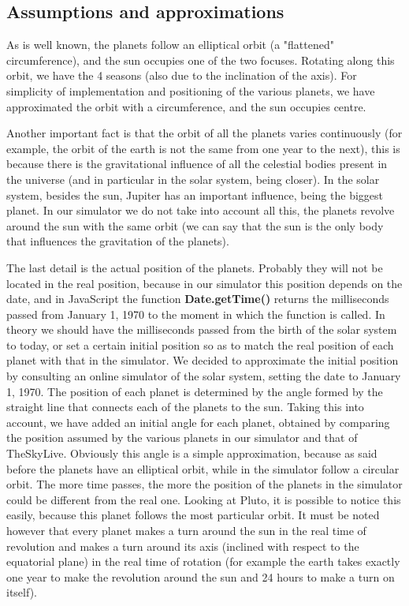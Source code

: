 \documentclass{article}
\begin{document}
\subsection{Assumptions and approximations}
As is well known, the planets follow an elliptical orbit (a "flattened" circumference), and the sun occupies one of the two focuses. Rotating along this orbit, we have the 4 seasons (also due to the inclination of the axis). For simplicity of implementation and positioning of the various planets, we have approximated the orbit with a circumference, and the sun occupies  centre. \newline
\par Another important fact is that the orbit of all the planets varies continuously (for example, the orbit of the earth is not the same from one year to the next), this is because there is the gravitational influence of all the celestial bodies present in the universe (and in particular in the solar system, being closer). In the solar system, besides the sun, Jupiter has an important influence, being the biggest planet. In our simulator we do not take into account all this, the planets revolve around the sun with the same orbit (we can say that the sun is the only body that influences the gravitation of the planets). \newline
\par The last detail is the actual position of the planets. Probably they will not be located in the real position, because in our simulator this position depends on the date, and in JavaScript the function \textbf{Date.getTime()} returns the milliseconds passed from January 1, 1970 to the moment in which the function is called. In theory we should have the milliseconds passed from the birth of the solar system to today, or set a certain initial position so as to match the real position of each planet with that in the simulator. 
We decided to approximate the initial position by consulting an online simulator of the solar system\cite{solarsystemrealpositon}, setting the date to January 1, 1970. The position of each planet is determined by the angle formed by the straight line that connects each of the planets to the sun. Taking this into account, we have added an initial angle for each planet, obtained by comparing the position assumed by the various planets in our simulator and that of TheSkyLive. Obviously this angle is a simple approximation, because as said before the planets have an elliptical orbit, while in the simulator follow a circular orbit. The more time passes, the more the position of the planets in the simulator could be different from the real one. Looking at Pluto, it is possible to notice this easily, because this planet follows the most particular orbit.
It must be noted however that every planet makes a turn around the sun in the real time of revolution and makes a turn around its axis (inclined with respect to the equatorial plane) in the real time of rotation (for example the earth takes exactly one year to make the revolution around the sun and 24 hours to make a turn on itself).
\end{document}
